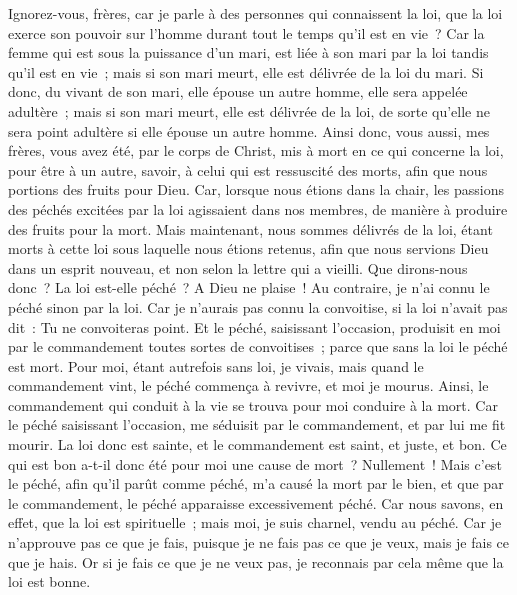 \begin{multicols}{2}
\VerseOne{}Ignorez-vous, frères, car je parle à des personnes qui connaissent la loi, que la loi exerce son pouvoir sur l'homme durant tout le temps qu'il est en vie~?
Car la femme qui est sous la puissance d'un mari, est liée à son mari par la loi tandis qu'il est en vie~; mais si son mari meurt, elle est délivrée de la loi du mari.
Si donc, du vivant de son mari, elle épouse un autre homme, elle sera appelée adultère~; mais si son mari meurt, elle est délivrée de la loi, de sorte qu'elle ne sera point adultère si elle épouse un autre homme.
Ainsi donc, vous aussi, mes frères, vous avez été, par le corps de Christ, mis à mort en ce qui concerne la loi, pour être à un autre, savoir, à celui qui est ressuscité des morts, afin que nous portions des fruits pour Dieu.
Car, lorsque nous étions dans la chair, les passions des péchés excitées par la loi agissaient dans nos membres, de manière à produire des fruits pour la mort.
Mais maintenant, nous sommes délivrés de la loi, étant morts à cette loi sous laquelle nous étions retenus, afin que nous servions Dieu dans un esprit nouveau, et non selon la lettre qui a vieilli.
Que dirons-nous donc~? La loi est-elle péché~? A Dieu ne plaise~! Au contraire, je n'ai connu le péché sinon par la loi. Car je n'aurais pas connu la convoitise, si la loi n'avait pas dit~: Tu ne convoiteras point.
Et le péché, saisissant l'occasion, produisit en moi par le commandement toutes sortes de convoitises~; parce que sans la loi le péché est mort.
Pour moi, étant autrefois sans loi, je vivais, mais quand le commandement vint, le péché commença à revivre, et moi je mourus.
Ainsi, le commandement qui conduit à la vie se trouva pour moi conduire à la mort.
Car le péché saisissant l'occasion, me séduisit par le commandement, et par lui me fit mourir.
La loi donc est sainte, et le commandement est saint, et juste, et bon.
Ce qui est bon a-t-il donc été pour moi une cause de mort~? Nullement~! Mais c'est le péché, afin qu'il parût comme péché, m'a causé la mort par le bien, et que par le commandement, le péché apparaisse excessivement péché.
Car nous savons, en effet, que la loi est spirituelle~; mais moi, je suis charnel, vendu au péché.
Car je n'approuve pas ce que je fais, puisque je ne fais pas ce que je veux, mais je fais ce que je hais.
Or si je fais ce que je ne veux pas, je reconnais par cela même que la loi est bonne.

\end{multicols}
